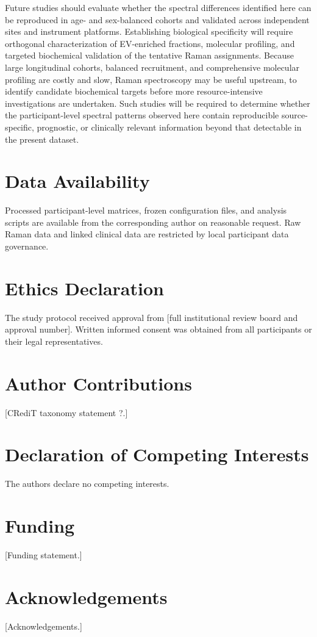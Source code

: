 \documentclass[preprint,12pt]{elsarticle}
\begin{document}
Future studies should evaluate whether the spectral differences identified here can be reproduced in age- and sex-balanced cohorts and validated across independent sites and instrument platforms. Establishing biological specificity will require orthogonal characterization of EV-enriched fractions, molecular profiling, and targeted biochemical validation of the tentative Raman assignments. Because large longitudinal cohorts, balanced recruitment, and comprehensive molecular profiling are costly and slow, Raman spectroscopy may be useful upstream, to identify candidate biochemical targets before more resource-intensive investigations are undertaken. Such studies will be required to determine whether the participant-level spectral patterns observed here contain reproducible source-specific, prognostic, or clinically relevant information beyond that detectable in the present dataset.


\section*{Data Availability}

Processed participant-level matrices, frozen configuration files, and analysis scripts are available from the corresponding author on reasonable request. Raw Raman data and linked clinical data are restricted by local participant data governance. 

\section*{Ethics Declaration}

The study protocol received approval from {\color{red}[full institutional review board and approval number]}. Written informed consent was obtained from all participants or their legal representatives.

\section*{Author Contributions}

{\color{red}[CRediT taxonomy statement ?.]}

\section*{Declaration of Competing Interests}

The authors declare no competing interests.

\section*{Funding}

{\color{red}[Funding statement.]}

\section*{Acknowledgements}

{\color{red}[Acknowledgements.]}

 
\end{document}
